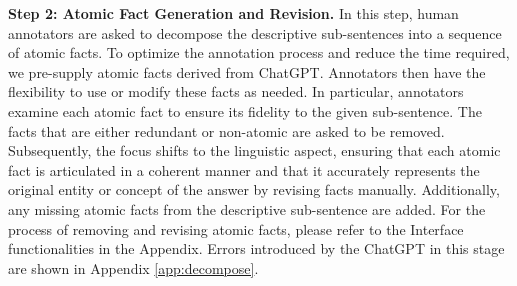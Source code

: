 \vspace{.5em}
\noindent \textbf{Step 2: Atomic Fact Generation and Revision.}
In this step, human annotators are asked to decompose the descriptive sub-sentences into a sequence of atomic facts. To optimize the annotation process and reduce the time required, we pre-supply atomic facts derived from ChatGPT. Annotators then have the flexibility to use or modify these facts as needed. In particular, annotators examine each atomic fact to ensure its fidelity to the given sub-sentence. The facts that are either redundant or non-atomic are asked to be removed. Subsequently, the focus shifts to the linguistic aspect, ensuring that each atomic fact is articulated in a coherent manner and that it accurately represents the original entity or concept of the answer by revising facts manually. Additionally, any missing atomic facts from the descriptive sub-sentence are added. 
For the process of removing and revising atomic facts, please refer to the Interface functionalities in the Appendix. \textcolor[rgb]{0,0,0}{ Errors introduced by the ChatGPT in this stage are shown in Appendix \ref{app:decompose}.}

